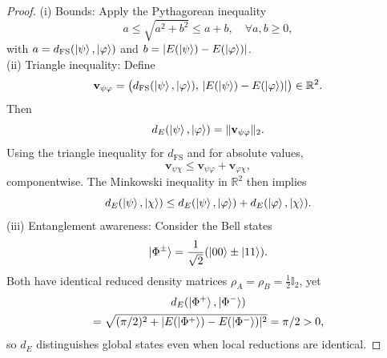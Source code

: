 \documentclass[10pt,a4paper]{amsart}
\begin{document}
\begin{proof}
{(i) Bounds:} Apply the Pythagorean inequality
\[
a \le \sqrt{a^2 + b^2} \le a + b, \quad \forall a,b \ge 0,
\]
with $a = d_{\text{FS}}(\ket{\psi},\ket{\varphi})$ and $b = |E(\ket{\psi}) - E(\ket{\varphi})|$.\\
{(ii) Triangle inequality:}
Define
\[
\mathbf{v}_{\psi\varphi}
=
\big(
d_{\mathrm{FS}}(\ket{\psi},\ket{\varphi}),
\, |E(\ket{\psi}) - E(\ket{\varphi})|
\big)
\in \mathbb{R}^2.
\]
Then
\[
d_E(\ket{\psi},\ket{\varphi})
=
\|\mathbf{v}_{\psi\varphi}\|_2.
\]
Using the triangle inequality for $d_{\mathrm{FS}}$ and for absolute values,
\[
\mathbf{v}_{\psi\chi}
\le
\mathbf{v}_{\psi\varphi}
+
\mathbf{v}_{\varphi\chi},
\]
componentwise. The Minkowski inequality in $\mathbb{R}^2$ then implies
\[
d_E(\ket{\psi},\ket{\chi})
\le
d_E(\ket{\psi},\ket{\varphi})
+
d_E(\ket{\varphi},\ket{\chi}).
\]
{(iii) Entanglement awareness:} Consider the Bell states
\[
\ket{\Phi^\pm} = \frac{1}{\sqrt{2}}(\ket{00} \pm \ket{11}).
\]
Both have identical reduced density matrices $\rho_A = \rho_B = \frac{1}{2} \mathbb{I}_2$, yet
\begin{multline}\notag 
d_E(\ket{\Phi^+},\ket{\Phi^-}) \\= \sqrt{(\pi/2)^2 + |E(\ket{\Phi^+}) - E(\ket{\Phi^-})|^2} = \pi/2 > 0,
\end{multline}
so $d_E$ distinguishes global states even when local reductions are identical.
\end{proof}
\end{document}

